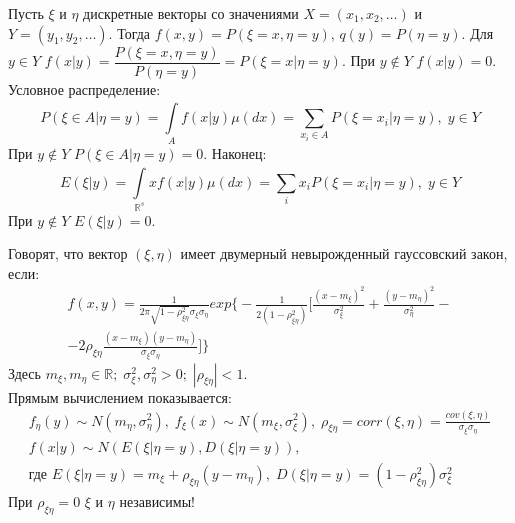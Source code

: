 \begin{example}
	Пусть $\xi$ и $\eta$ дискретные векторы со значениями $X = (x_1, x_2, \dots)$ и $Y = (y_1, y_2, \dots)$. Тогда $f(x,y) = P(\xi = x, \eta = y)$, $q(y) = P(\eta = y)$. Для $y \in Y$ $\displaystyle f(x|y) = \dfrac{P(\xi = x, \eta = y)}{P(\eta = y)} = P(\xi = x | \eta = y)$. При $y \not \in Y$ $f(x|y) = 0$. Условное распределение:
	$$P(\xi \in A| \eta = y) = \underset{A}{\overset{}{\int}}f(x|y)\mu (d x) = \underset{x_i \in A}{\overset{}{\sum}}P(\xi = x_i | \eta = y), \; y \in Y$$
	При $y \not \in Y$ $P(\xi \in A | \eta = y) = 0$. Наконец:
	$$E(\xi | y) = \underset{\mathbb{R}^s}{\overset{}{\int}}x f(x|y) \mu (d x) = \underset{i}{\overset{}{\sum}}x_i P(\xi = x_i| \eta = y), \; y \in Y$$
	При $y \not \in Y$ $E(\xi | y) = 0$.
\end{example}

\begin{example}
	Говорят, что вектор $(\xi, \eta)$ имеет двумерный невырожденный гауссовский закон, если:
	$$\begin{gathered}
		f(x,y) = \frac{1}{2\pi \sqrt{1 - \rho_{\xi \eta}^2}\sigma_{\xi}\sigma_{\eta}}exp \Big\{ -\frac{1}{2 (1 - \rho_{\xi \eta}^2)} \Big[ \frac{(x - m_{\xi})^2}{\sigma_{\xi}^2} + \frac{(y - m_{\eta})^2}{\sigma_{\eta}^2} - \\
		- 2 \rho_{\xi \eta} \frac{(x - m_{\xi})(y - m_{\eta})}{\sigma_{\xi} \sigma_{\eta}}\Big] \Big\}
	\end{gathered}$$
	Здесь $m_{\xi}, m_{\eta} \in\mathbb{R}; \; \sigma_{\xi}^2, \sigma_{\eta}^2 > 0; \; |\rho_{\xi \eta}| < 1$.\\
	Прямым вычислением показывается:
	$$\begin{gathered}
		f_{\eta}(y) \sim N(m_{\eta}, \sigma_{\eta}^2), \; f_{\xi}(x) \sim N(m_{\xi}, \sigma_{\xi}^2), \; \rho_{\xi \eta} = corr (\xi, \eta) = \frac{cov(\xi, \eta)}{\sigma_{\xi} \sigma_{\eta}} \\
		f(x|y) \sim N\left( E(\xi | \eta = y), D(\xi | \eta = y) \right),\\
		\text{где } E(\xi | \eta = y) = m_{\xi} + \rho_{\xi \eta}(y - m_{\eta}), \; D(\xi | \eta = y) = (1 - \rho_{\xi \eta}^2) \sigma_{\xi}^2
	\end{gathered}$$
	При $\rho_{\xi \eta} = 0$ $\xi$ и $\eta$ независимы!
\end{example}





































